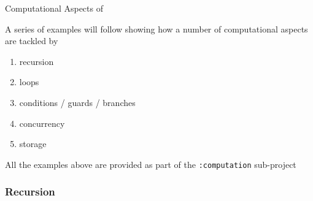 \documentclass[presentation]{beamer}\mode<presentation>{\usetheme{AMSBolognaFC}}
\begin{document}
\begin{frame}[c]{Computational Aspects of \jason{}}

A series of examples will follow showing how a number of computational aspects are tackled by \jason{}
%
\begin{enumerate}
    \item recursion
    \item loops
    \item conditions / guards / branches
    \item concurrency
    \item storage
\end{enumerate}

\vfill

All the examples above are provided as part of the \texttt{:computation} sub-project

\end{frame} 

\subsubsection{Recursion}
\end{document}
